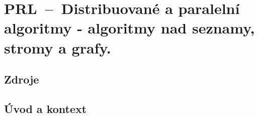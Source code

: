 

\graphicspath{{prl/paralelni_algoritmy_seznamy_stromy_grafy/figures}}


\chapter{PRL~--~Distribuované a paralelní algoritmy - algoritmy nad seznamy, stromy a grafy.}


\section{Zdroje}

\begin{compactitem}
    \item {}
\end{compactitem}


\section{Úvod a kontext}

\begin{compactitem}
    \item {}
\end{compactitem}
